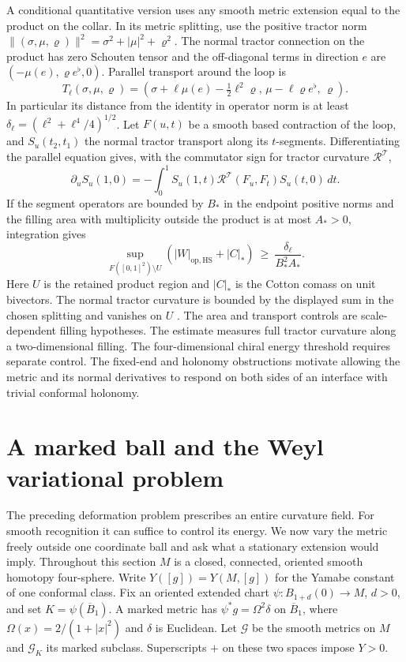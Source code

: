 \documentclass[11pt]{article}
\numberwithin{equation}{section}
\theoremstyle{definition}
\theoremstyle{remark}
\begin{document}
A conditional quantitative version uses any smooth metric extension
equal to the product on the collar. In its metric splitting, use
the positive tractor norm
\(\|(\sigma,\mu,\varrho)\|^2=\sigma^2+|\mu|^2+\varrho^2\).
The normal tractor connection on the product has zero Schouten tensor
and the off-diagonal terms in direction \(e\) are
\((-\mu(e),\varrho e^\flat,0)\). Parallel transport around the loop is
\[
 T_\ell(\sigma,\mu,\varrho)=
 (\sigma+\ell\mu(e)-\tfrac12\ell^2\varrho,\,
  \mu-\ell\varrho e^\flat,\,\varrho).
\]
In particular its distance from the identity in operator norm is
at least \(\delta_\ell=(\ell^2+\ell^4/4)^{1/2}\).
Let \(F(u,t)\) be a smooth based contraction of the loop, and
\(S_u(t_2,t_1)\) the normal tractor transport along its \(t\)-segments.
Differentiating the parallel equation gives, with the commutator sign
for tractor curvature \(\mathcal R^{\mathcal T}\),
\[
 \partial_u S_u(1,0)
 =-\int_0^1 S_u(1,t)\mathcal R^{\mathcal T}(F_u,F_t)S_u(t,0)\,dt .
\]
If the segment operators are bounded by \(B_*\) in the endpoint
positive norms and the filling area with multiplicity outside the
product is at most \(A_*>0\), integration gives
\[
 \sup_{F([0,1]^2)\setminus U} (|W|_{\mathrm{op,HS}}+|C|_*)
 \ \ge\ \frac{\delta_\ell}{B_*^2 A_*}.
\]
Here \(U\) is the retained product region and \(|C|_*\) is the
Cotton comass on unit bivectors. The normal tractor curvature is
bounded by the displayed sum in the chosen splitting and vanishes on
\(U\) \cite[(22) and (32)]{CurryGover2015Introduction}. The area and
transport controls are scale-dependent filling hypotheses. The
estimate measures full tractor curvature along a two-dimensional
filling. The four-dimensional chiral energy threshold requires
separate control. The fixed-end and holonomy obstructions motivate
allowing the metric and its normal derivatives to respond on both
sides of an interface with trivial conformal holonomy.

\section{A marked ball and the Weyl variational problem}\label{sec:variation}

The preceding deformation problem prescribes an entire curvature field.
For smooth recognition it can suffice to control its energy. We now
vary the metric freely outside one coordinate ball and ask what a
stationary extension would imply. Throughout this section \(M\) is a
closed, connected, oriented smooth homotopy four-sphere.
Write \(Y([g])=Y(M,[g])\) for the Yamabe constant of one conformal
class. Fix an oriented extended chart \(\psi:B_{1+d}(0)\to M\),
\(d>0\), and set \(K=\psi(\overline B_1)\). A marked metric has
\(\psi^*g=\Omega^2\delta\) on \(\overline B_1\), where
\(\Omega(x)=2/(1+|x|^2)\) and \(\delta\) is Euclidean. Let
\(\mathcal G\) be the smooth metrics on \(M\) and \(\mathcal G_K\) its
marked subclass. Superscripts \(+\) on these two spaces impose \(Y>0\).
\end{document}
